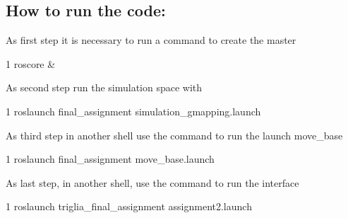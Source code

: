 \subsection*{How to run the code\+:}


\begin{DoxyItemize}
\item As first step it is necessary to run a command to create the master 
\begin{DoxyCode}
1 roscore & 
\end{DoxyCode}

\item As second step run the simulation space with 
\begin{DoxyCode}
1 roslaunch final\_assignment simulation\_gmapping.launch
\end{DoxyCode}

\item As third step in another shell use the command to run the launch move\+\_\+base 
\begin{DoxyCode}
1 roslaunch final\_assignment move\_base.launch
\end{DoxyCode}

\item As last step, in another shell, use the command to run the interface 
\begin{DoxyCode}
1 roslaunch triglia\_final\_assignment assignment2.launch
\end{DoxyCode}
 
\end{DoxyItemize}
